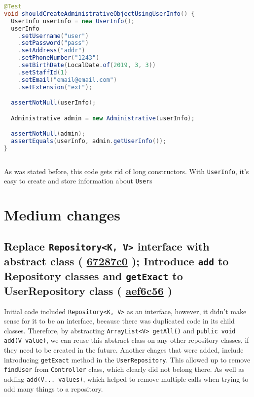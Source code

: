 \documentclass{article}
\newcommand{\code}[1]{\texttt{#1}}
\newcommand{\gh}[1]{%
  \href{https://github.com/awave1/assessment-loan-system/commit/#1}{#1}%
}
\begin{document}
\begin{lstlisting}[language=Java]
@Test
void shouldCreateAdministrativeObjectUsingUserInfo() {
  UserInfo userInfo = new UserInfo();
  userInfo
    .setUsername("user")
    .setPassword("pass")
    .setAddress("addr")
    .setPhoneNumber("1243")
    .setBirthDate(LocalDate.of(2019, 3, 3))
    .setStaffId(1)
    .setEmail("email@email.com")
    .setExtension("ext");

  assertNotNull(userInfo);

  Administrative admin = new Administrative(userInfo);

  assertNotNull(admin);
  assertEquals(userInfo, admin.getUserInfo());
}
  
\end{lstlisting}

As was stated before, this code gets rid of long constructors. With \code{UserInfo}, it's easy to create and store information about \code{User}s

\section*{Medium changes}

\subsection*{Replace \code{Repository<K, V>} interface with abstract class (\gh{67287c0}); Introduce \code{add} to Repository classes and \code{getExact} to UserRepository class (\gh{aef6c56})}
Initial code included \code{Repository<K, V>} as an interface, however, it didn't make sense for it to be an interface, because there was duplicated code in its child classes. Therefore, by abstracting \code{ArrayList<V> getAll()} and \code{public void add(V value)}, we can reuse this abstract class on any other repository classes, if they need to be created in the future. Another chages that were added, include introducing \code{getExact} method in the \code{UserRepository}. This allowed up to remove \code{findUser} from \code{Controller} class, which clearly did not belong there. As well as adding \code{add(V... values)}, which helped to remove multiple calls when trying to add many things to a repository.
\end{document}
